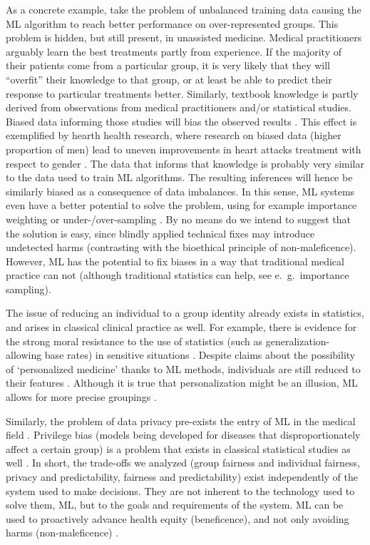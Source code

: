     As a concrete example, take the problem of unbalanced training data causing the ML algorithm to reach better performance on over-represented groups.
    This problem is hidden, but still present, in unassisted medicine.
    Medical practitioners arguably learn the best treatments partly from experience.
    If the majority of their patients come from a particular group, it is very likely that they will ``overfit'' their knowledge to that group, or at least be able to predict their response to particular treatments better.
    Similarly, textbook knowledge is partly derived from observations from medical practitioners and/or statistical studies.
    Biased data informing those studies will bias the observed results \cite{Chen2021}.
    This effect is exemplified by hearth health research, where research on biased data (higher proportion of men) lead to uneven improvements in heart attacks treatment with respect to gender \cite[e221]{Mccradden2020}.
    The data that informs that knowledge is probably very similar to the data used to train ML algorithms.
    The resulting inferences will hence be similarly biased as a consequence of data imbalances.
    In this sense, ML systems even have a better potential to solve the problem, using for example importance weighting or under-/over-sampling \cite[pp.~6-8]{Chen2021}.
    By no means do we intend to suggest that the solution is easy, since blindly applied technical fixes may introduce undetected harms (contrasting with the bioethical principle of non-maleficence).
    However, ML has the potential to fix biases in a way that traditional medical practice can not \cite[p.~e222]{Mccradden2020} (although traditional statistics can help, see e.~g.~importance sampling).

    The issue of reducing an individual to a group identity already exists in statistics, and arises in classical clinical practice as well.
    For example, there is evidence for the strong moral resistance to the use of statistics (such as generalization-allowing base rates) in sensitive situations \cite{Tetlock2003}.
    Despite claims about the possibility of `personalized medicine' thanks to ML methods, individuals are still reduced to their features \cite{Dijkstra2020}.
    Although it is true that personalization might be an illusion, ML allows for more precise groupings .

    Similarly, the problem of data privacy pre-exists the entry of ML in the medical field \cite[p.~346]{Dijkstra2020}.
    Privilege bias (models being developed for diseases that disproportionately affect a certain group) \cite[p.~5]{Rajkomar2018} is a problem that exists in classical statistical studies as well \cite{Jackson2019}.
    In short, the trade-offs we analyzed (group fairness and individual fairness, privacy and predictability, fairness and predictability) exist independently of the system used to make decisions.
    They are not inherent to the technology used to solve them, ML, but to the goals and requirements of the system.
    ML can be used to proactively advance health equity (beneficence), and not only avoiding harms (non-maleficence) \cite[p.~2]{Rajkomar2018}\cite{Mccradden2020}.



